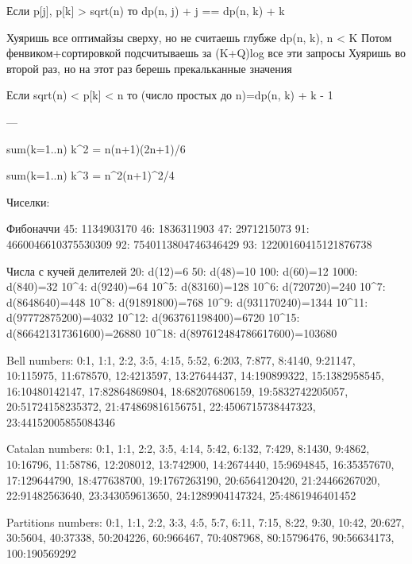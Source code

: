 Если p[j], p[k] > sqrt(n) то dp(n, j) + j == dp(n, k) + k

Хуяришь все оптимайзы сверху, но не считаешь глубже dp(n, k), n < K
Потом фенвиком+сортировкой подсчитываешь за (K+Q)log все эти запросы
Хуяришь во второй раз, но на этот раз берешь прекальканные значения

Если sqrt(n) < p[k] < n то (число простых до n)=dp(n, k) + k - 1

---

sum(k=1..n) k^2 = n(n+1)(2n+1)/6

sum(k=1..n) k^3 = n^2(n+1)^2/4


Чиселки: 

Фибоначчи
45:  1134903170
46:  1836311903
47:  2971215073
91:  4660046610375530309
92:  7540113804746346429
93:  12200160415121876738

Числа с кучей делителей
20: d(12)=6
50: d(48)=10
100: d(60)=12
1000: d(840)=32
10^4: d(9240)=64
10^5: d(83160)=128
10^6: d(720720)=240
10^7: d(8648640)=448
10^8: d(91891800)=768
10^9: d(931170240)=1344
10^{11}: d(97772875200)=4032
10^{12}: d(963761198400)=6720
10^{15}: d(866421317361600)=26880
10^{18}: d(897612484786617600)=103680

Bell numbers:
0:1, 1:1, 2:2, 3:5, 4:15, 5:52, 6:203, 7:877, 8:4140, 9:21147,
10:115975, 11:678570, 12:4213597, 13:27644437, 14:190899322,
15:1382958545, 16:10480142147, 17:82864869804, 18:682076806159,
19:5832742205057, 20:51724158235372, 21:474869816156751,
22:4506715738447323, 23:44152005855084346

Catalan numbers:
0:1, 1:1, 2:2, 3:5, 4:14, 5:42, 6:132, 7:429, 8:1430, 9:4862,
10:16796, 11:58786, 12:208012, 13:742900, 14:2674440,
15:9694845, 16:35357670, 17:129644790, 18:477638700,
19:1767263190, 20:6564120420, 21:24466267020, 22:91482563640,
23:343059613650, 24:1289904147324, 25:4861946401452

Partitions numbers:
0:1, 1:1, 2:2, 3:3, 4:5, 5:7, 6:11, 7:15, 8:22, 9:30, 10:42, 20:627, 30:5604, 40:37338, 50:204226, 60:966467, 70:4087968, 80:15796476, 90:56634173, 100:190569292